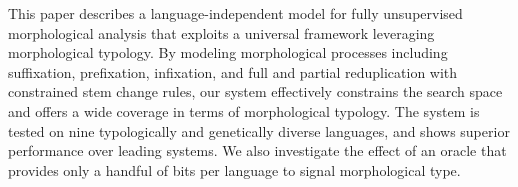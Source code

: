 This paper describes a language-independent model for fully unsupervised morphological analysis that exploits a universal framework leveraging morphological typology. By modeling morphological processes including suffixation, prefixation, infixation, and full and partial reduplication with constrained stem change rules, our system effectively constrains the search space and offers a wide coverage in terms of morphological typology. The system is tested on nine typologically and genetically diverse languages, and shows superior performance over leading systems. We also investigate the effect of an oracle that provides only a handful of bits per language to signal morphological type.
